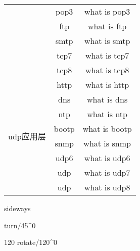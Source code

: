 \begin{tabular}{|c|c|c|c|c|c|c|c|c|}
  \cline{2-9}
  & pop3 & \multicolumn{7}{c|}{what is pop3} \\
  \cline{2-9}
  & ftp & \multicolumn{7}{c|}{what is ftp} \\
  \cline{2-9}
  & smtp & \multicolumn{7}{c|}{what is smtp} \\
  \cline{2-9}
  & tcp7 & \multicolumn{7}{c|}{what is tcp7} \\
  \cline{2-9}
  & tcp8 & \multicolumn{7}{c|}{what is tcp8} \\
  \hline
  \multirow{8}{*}{\begin{sideways}\footnotesize{udp应用层}\end{sideways}}
  & http & \multicolumn{7}{c|}{what is http} \\
  \cline{2-9}
  & dns & \multicolumn{7}{c|}{what is dns} \\
  \cline{2-9}
  & ntp & \multicolumn{7}{c|}{what is ntp} \\
  \cline{2-9}
  & bootp & \multicolumn{7}{c|}{what is bootp} \\
  \cline{2-9}
  & snmp & \multicolumn{7}{c|}{what is snmp} \\
  \cline{2-9}
  & udp6 & \multicolumn{7}{c|}{what is udp6} \\
  \cline{2-9}
  & udp & \multicolumn{7}{c|}{what is udp7} \\
  \cline{2-9}
  & udp & \multicolumn{7}{c|}{what is udp8} \\
  \hline
\end{tabular}

\newpage
\begin{sideways}
  sideways
\end{sideways}
\begin{turn}{45}
  turn/45^0
\end{turn}
\begin{rotate}{120}
  rotate/120^0
\end{rotate}
